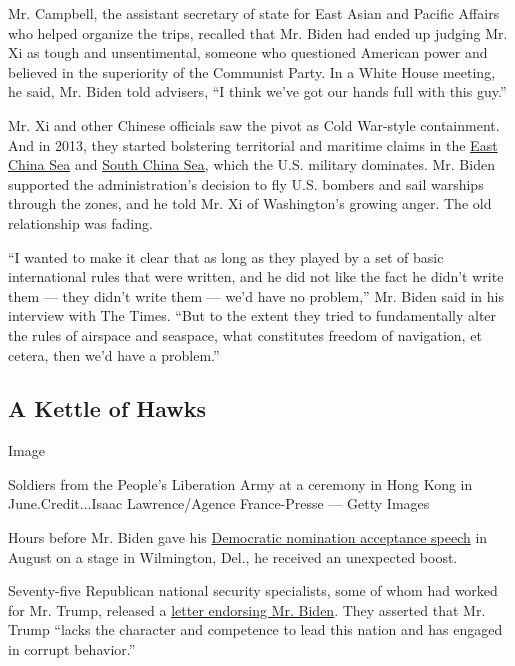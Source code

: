 Mr. Campbell, the assistant secretary of state for East Asian and
Pacific Affairs who helped organize the trips, recalled that Mr. Biden
had ended up judging Mr. Xi as tough and unsentimental, someone who
questioned American power and believed in the superiority of the
Communist Party. In a White House meeting, he said, Mr. Biden told
advisers, ``I think we've got our hands full with this guy.''

Mr. Xi and other Chinese officials saw the pivot as Cold War-style
containment. And in 2013, they started bolstering territorial and
maritime claims in the
\href{https://www.nytimes3xbfgragh.onion/2013/11/24/world/asia/china-warns-of-action-against-aircraft-over-disputed-seas.html}{East
China Sea} and
\href{https://www.nytimes3xbfgragh.onion/2014/06/17/world/asia/spratly-archipelago-china-trying-to-bolster-its-claims-plants-islands-in-disputed-waters.html}{South
China Sea}, which the U.S. military dominates. Mr. Biden supported the
administration's decision to fly U.S. bombers and sail warships through
the zones, and he told Mr. Xi of Washington's growing anger. The old
relationship was fading.

``I wanted to make it clear that as long as they played by a set of
basic international rules that were written, and he did not like the
fact he didn't write them --- they didn't write them --- we'd have no
problem,'' Mr. Biden said in his interview with The Times. ``But to the
extent they tried to fundamentally alter the rules of airspace and
seaspace, what constitutes freedom of navigation, et cetera, then we'd
have a problem.''

\hypertarget{a-kettle-of-hawks}{%
\subsection{A Kettle of Hawks}\label{a-kettle-of-hawks}}

Image

Soldiers from the People's Liberation Army at a ceremony in Hong Kong in
June.Credit...Isaac Lawrence/Agence France-Presse --- Getty Images

Hours before Mr. Biden gave his
\href{https://www.youtube.com/watch?v=pnmQr0WfSvo}{Democratic nomination
acceptance speech} in August on a stage in Wilmington, Del., he received
an unexpected boost.

Seventy-five Republican national security specialists, some of whom had
worked for Mr. Trump, released a
\href{https://www.defendingdemocracytogether.org/national-security/}{letter
endorsing Mr. Biden}. They asserted that Mr. Trump ``lacks the character
and competence to lead this nation and has engaged in corrupt
behavior.''

